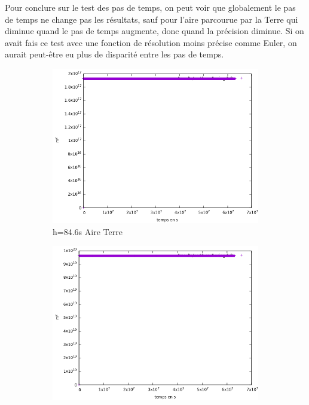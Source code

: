 \documentclass[11pt]{article}
\begin{document}
Pour conclure sur le test des pas de temps, on peut voir que globalement le pas de temps ne change pas les résultats, sauf pour l'aire parcourue par la Terre qui diminue quand le pas de temps augmente, donc quand la précision diminue. Si on avait fais ce test avec une fonction de résolution moins précise comme Euler, on aurait peut-être eu plus de disparité entre les pas de temps.


\begin{figure}[H]
\begin{subfigure}{0.5\textwidth}
\includegraphics[width=1\linewidth]{modelisations/h=60s/aire_terre.png}
\caption{h=84.6s Aire Terre}
\label{fig:3subim1}
\end{subfigure}
\begin{subfigure}{0.5\textwidth}
\includegraphics[width=1\linewidth]{modelisations/h=0.5j/aire_terre_0.5.png}

\end{subfigure}
\end{figure}
\end{document}
